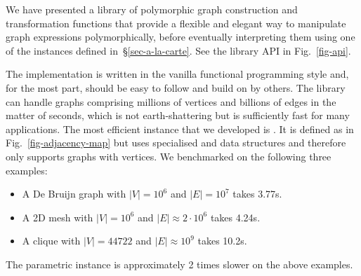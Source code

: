 We have presented a library of polymorphic graph construction and
transformation functions that
provide a flexible and elegant way to manipulate graph expressions
polymorphically, before eventually interpreting them using one of the 
instances defined in~\S\ref{sec-a-la-carte}. See the library API in
Fig.~\ref{fig-api}.

The implementation is written in the vanilla functional programming style
and, for the most part, should be easy to follow and build on by others.
The library can handle graphs
comprising millions of vertices and billions of edges in the matter of
seconds, which is not earth-shattering but is sufficiently fast for many applications.
The most efficient  instance that we developed is .
It is defined as in Fig.~\ref{fig-adjacency-map} but uses specialised
 and  data structures and therefore
only supports graphs with  vertices. We benchmarked 
on the following three examples:

\begin{itemize}
    \item A De Bruijn graph  with
    $|V|=10^6$ and $|E|=10^7$ takes 3.77s.

    \item A 2D mesh 
    with $|V|=10^6$ and $|E| \approx 2\cdot 10^6$ takes 4.24s.

    \item A clique  with $|V|=44722$ and $|E| \approx 10^9$
    takes 10.2s.
\end{itemize}

The parametric  instance is approximately 2 times slower
on the above examples.
